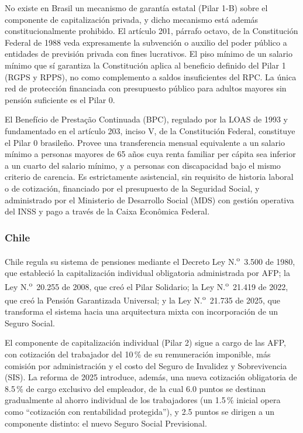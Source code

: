 \documentclass[12pt, letterpaper]{article}
\begin{document}
No existe en Brasil un mecanismo de garantía estatal (Pilar 1-B) sobre el componente de capitalización privada, y dicho mecanismo está además constitucionalmente prohibido. El artículo 201, párrafo octavo, de la Constitución Federal de 1988 veda expresamente la subvención o auxilio del poder público a entidades de previsión privada con fines lucrativos. El piso mínimo de un salario mínimo que sí garantiza la Constitución aplica al beneficio definido del Pilar 1 (RGPS y RPPS), no como complemento a saldos insuficientes del RPC. La única red de protección financiada con presupuesto público para adultos mayores sin pensión suficiente es el Pilar 0.

El Benefício de Prestação Continuada (BPC), regulado por la LOAS de 1993 y fundamentado en el artículo 203, inciso V, de la Constitución Federal, constituye el Pilar 0 brasileño. Provee una transferencia mensual equivalente a un salario mínimo a personas mayores de 65 años cuya renta familiar per cápita sea inferior a un cuarto del salario mínimo, y a personas con discapacidad bajo el mismo criterio de carencia. Es estrictamente asistencial, sin requisito de historia laboral o de cotización, financiado por el presupuesto de la Seguridad Social, y administrado por el Ministerio de Desarrollo Social (MDS) con gestión operativa del INSS y pago a través de la Caixa Econômica Federal.

\subsubsection{Chile}
\label{sec:chile}

Chile regula su sistema de pensiones mediante el Decreto Ley N.\textsuperscript{o}~3.500 de 1980, que estableció la capitalización individual obligatoria administrada por AFP; la Ley N.\textsuperscript{o}~20.255 de 2008, que creó el Pilar Solidario; la Ley N.\textsuperscript{o}~21.419 de 2022, que creó la Pensión Garantizada Universal; y la Ley N.\textsuperscript{o}~21.735 de 2025, que transforma el sistema hacia una arquitectura mixta con incorporación de un Seguro Social.

El componente de capitalización individual (Pilar 2) sigue a cargo de las AFP, con cotización del trabajador del 10\,\% de su remuneración imponible, más comisión por administración y el costo del Seguro de Invalidez y Sobrevivencia (SIS). La reforma de 2025 introduce, además, una nueva cotización obligatoria de 8.5\,\% de cargo exclusivo del empleador, de la cual 6.0 puntos se destinan gradualmente al ahorro individual de los trabajadores (un 1.5\,\% inicial opera como ``cotización con rentabilidad protegida''), y 2.5 puntos se dirigen a un componente distinto: el nuevo Seguro Social Previsional.
\end{document}
